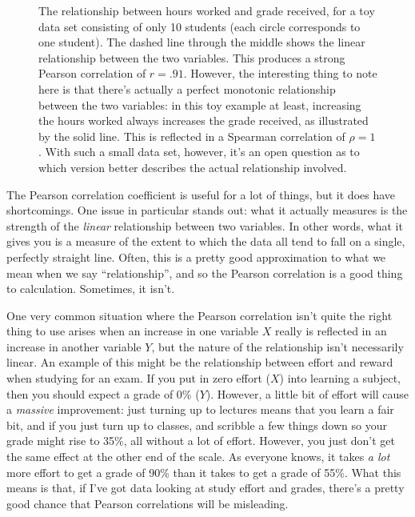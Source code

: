 
\begin{figure}[t]
\begin{center}
\end{center}
\caption{The relationship between hours worked and grade received, for a toy data set consisting of only 10 students (each circle corresponds to one student). The dashed line through the middle shows the linear relationship between the two variables. This produces a strong Pearson correlation of $r = .91$. However, the interesting thing to note here is that there's actually a perfect monotonic relationship between the two variables: in this toy example at least, increasing the hours worked always increases the grade received, as illustrated by the solid line. This is reflected in a Spearman correlation of $\rho = 1$. With such a small data set, however, it's an open question as to which version better describes the actual relationship involved. }
\HR
\label{fig:rankcorrpic}
\end{figure}

The Pearson correlation coefficient is useful for a lot of things, but it does have shortcomings. One issue in particular stands out: what it actually measures is the strength of the {\it linear} relationship between two variables. In other words, what it gives you is a measure of the extent to which the data all tend to fall on a single, perfectly straight line. Often, this is a pretty good approximation to what we mean when we say ``relationship'', and so the Pearson correlation is a good thing to calculation. Sometimes, it isn't. 

One very common situation where the Pearson correlation isn't quite the right thing to use arises when an increase in one variable $X$ really is reflected in an increase in another variable $Y$, but the nature of the relationship isn't necessarily linear. An example of this might be the relationship between effort and reward when studying for an exam. If you put in zero effort ($X$) into learning a subject, then you should expect a grade of 0\% ($Y$). However, a little bit of effort will cause a {\it massive} improvement: just turning up to lectures means that you learn a fair bit, and if you just turn up to classes, and scribble a few things down so your grade might rise to 35\%, all without a lot of effort. However, you just don't get the same effect at the other end of the scale. As everyone knows, it takes {\it a lot} more effort to get a grade of 90\% than it takes to get a grade of 55\%. What this means is that, if I've got data looking at study effort and grades, there's a pretty good chance that Pearson correlations will be misleading. 


